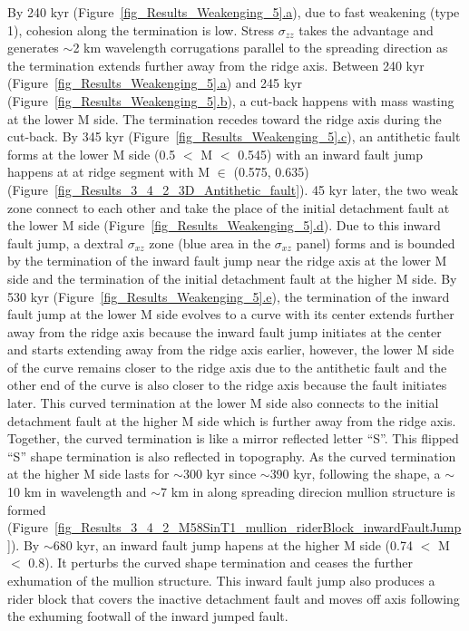By 240 kyr (Figure~\hyperref[fig_Results_Weakenging_5]{\ref{fig_Results_Weakenging_5}.a}), due to fast weakening (type 1), cohesion along the termination is low. Stress $\sigma_{zz}$ takes the advantage and generates $\sim$2 km wavelength corrugations parallel to the spreading direction as the termination extends further away from the ridge axis. Between 240 kyr (Figure~\hyperref[fig_Results_Weakenging_5]{\ref{fig_Results_Weakenging_5}.a}) and 245 kyr (Figure~\hyperref[fig_Results_Weakenging_5]{\ref{fig_Results_Weakenging_5}.b}), a cut-back happens with mass wasting at the lower M side. The termination recedes toward the ridge axis during the cut-back. By 345 kyr (Figure~\hyperref[fig_Results_Weakenging_5]{\ref{fig_Results_Weakenging_5}.c}), an antithetic fault forms at the lower M side (0.5 $<$ M $<$ 0.545) with an inward fault jump happens at at ridge segment with M $\in$ (0.575, 0.635) (Figure~\hyperref[fig_Results_3_4_2_3D_Antithetic_fault]{\ref{fig_Results_3_4_2_3D_Antithetic_fault}}). 45 kyr later, the two weak zone connect to each other and take the place of the initial detachment fault at the lower M side (Figure~\hyperref[fig_Results_Weakenging_5]{\ref{fig_Results_Weakenging_5}.d}). Due to this inward fault jump, a dextral $\sigma_{xz}$ zone (blue area in the $\sigma_{xz}$ panel) forms and is bounded by the termination of the inward fault jump near the ridge axis at the lower M side and the termination of the initial detachment fault at the higher M side. By 530 kyr (Figure~\hyperref[fig_Results_Weakenging_5]{\ref{fig_Results_Weakenging_5}.e}), the termination of the inward fault jump at the lower M side evolves to a curve with its center extends further away from the ridge axis because the inward fault jump initiates at the center and starts extending away from the ridge axis earlier, however, the lower M side of the curve remains closer to the ridge axis due to the antithetic fault and the other end of the curve is also closer to the ridge axis because the fault initiates later. This curved termination at the lower M side also connects to the initial detachment fault at the higher M side which is further away from the ridge axis. Together, the curved termination is like a mirror reflected letter ``S''. This flipped ``S'' shape termination is also reflected in topography. As the curved termination at the higher M side lasts for $\sim$300 kyr since $\sim$390 kyr, following the shape, a $\sim$10 km in wavelength and $\sim$7 km in along spreading direcion mullion structure is formed (Figure~\hyperref[fig_Results_3_4_2_M58SinT1_mullion_riderBlock_inwardFaultJump]{\ref{fig_Results_3_4_2_M58SinT1_mullion_riderBlock_inwardFaultJump}}). By $\sim$680 kyr, an inward fault jump hapens at the higher M side (0.74 $<$ M $<$ 0.8). It perturbs the curved shape termination and ceases the further exhumation of the mullion structure. This inward fault jump also produces a rider block that covers the inactive detachment fault and moves off axis following the exhuming footwall of the inward jumped fault.

